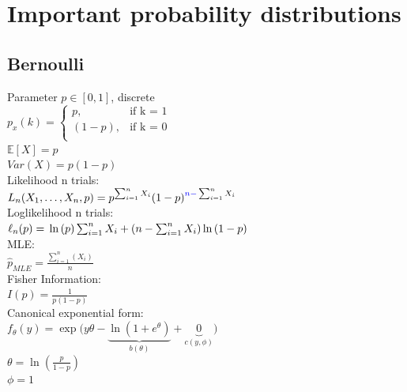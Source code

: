 \section{Important probability distributions}
\subsection*{Bernoulli}
Parameter $p \in[0,1]$, discrete\\
$ p_x(k)=
	\begin{cases}
		 p,&\text{if k = 1}\\
		(1-p),&\text{if k = 0}\\
	\end{cases}
$\\

$\mathbb{E}[X]=p$\\

$Var(X)=p(1-p)$\\

Likelihood n trials:\\

$L_ n(X_1, \ldots , X_ n, p) =\\
p^{\sum _{i = 1}^ n X_ i} (1 -p)^{{\color{blue}{n - }} \sum _{i = 1}^ n X_ i}$ \\

Loglikelihood n trials:\\

$\ell_n (p) = \\ \ln  \left( p \right) \sum _{i=1}^{n}X_{{i}}+ \left( n-\sum _{i=1}^{n}
X_{{i}} \right) \ln  \left( 1-p \right) 
$\\

MLE:\\

$\hat{p}_{MLE} = \frac{\sum^n_{i=1}(X_i)}{n}$\\

Fisher Information:\\

$I(p) = \frac{1}{p(1-p)}$\\

Canonical exponential form:\\

$f_{\theta}(y)=\exp\big(y\theta - \underbrace{\ln(1 + e^\theta)}_{b(\theta)} + \underbrace{0}_{c(y, \phi)}\big) \quad$\\

$\theta = \ln\left(\frac{p}{1-p}\right)$\\
$\phi = 1$\\

